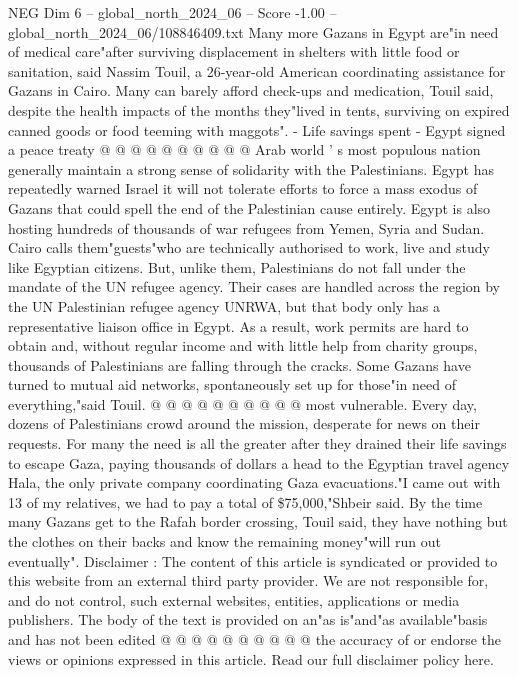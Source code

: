 \begin{textsample}{NEG Dim 6 – global\_north\_2024\_06 – Score -1.00 – global\_north\_2024\_06/108846409.txt}
Many more Gazans in Egypt are"in need of medical care"after surviving displacement in shelters with little food or sanitation, said Nassim Touil, a 26-year-old American coordinating assistance for Gazans in Cairo.
Many can barely afford check-ups and medication, Touil said, despite the health impacts of the months they"lived in tents, surviving on expired canned goods or food teeming with maggots". - Life savings spent - Egypt signed a peace treaty @ @ @ @ @ @ @ @ @ @ Arab world ' s most populous nation generally maintain a strong sense of solidarity with the Palestinians.
Egypt has repeatedly warned Israel it will not tolerate efforts to force a mass exodus of Gazans that could spell the end of the Palestinian cause entirely.
Egypt is also hosting hundreds of thousands of war refugees from Yemen, Syria and Sudan.
Cairo calls them"guests"who are technically authorised to work, live and study like Egyptian citizens.
But, unlike them, Palestinians do not fall under the mandate of the UN refugee agency.
Their cases are handled across the region by the UN Palestinian refugee agency UNRWA, but that body only has a representative liaison office in Egypt.
As a result, work permits are hard to obtain and, without regular income and with little help from charity groups, thousands of Palestinians are falling through the cracks.
Some Gazans have turned to mutual aid networks, spontaneously set up for those"in need of everything,"said Touil. @ @ @ @ @ @ @ @ @ @ most vulnerable.
Every day, dozens of Palestinians crowd around the mission, desperate for news on their requests.
For many the need is all the greater after they drained their life savings to escape Gaza, paying thousands of dollars a head to the Egyptian travel agency Hala, the only private company coordinating Gaza evacuations."I came out with 13 of my relatives, we had to pay a total of \$75,000,"Shbeir said.
By the time many Gazans get to the Rafah border crossing, Touil said, they have nothing but the clothes on their backs and know the remaining money"will run out eventually".
Disclaimer : The content of this article is syndicated or provided to this website from an external third party provider.
We are not responsible for, and do not control, such external websites, entities, applications or media publishers.
The body of the text is provided on an"as is"and"as available"basis and has not been edited @ @ @ @ @ @ @ @ @ @ the accuracy of or endorse the views or opinions expressed in this article.
Read our full disclaimer policy here.

\end{textsample}
